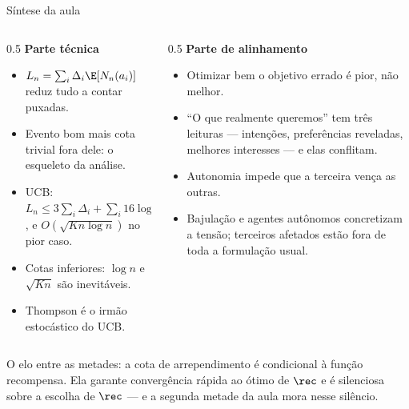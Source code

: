 \documentclass[aspectratio=169, 11pt]{beamer}
\begin{document}
\begin{frame}{Síntese da aula}
  \begin{columns}[T]
    \begin{column}{0.5\textwidth}
      \textbf{Parte técnica}
      {\footnotesize
      \begin{itemize}\setlength{\itemsep}{0.15ex}
        \item $L_n=\sum_i\Delta_i\E[N_n(a_i)]$ reduz tudo a contar puxadas.
        \item Evento bom mais cota trivial fora dele: o esqueleto da análise.
        \item UCB: $L_n \le 3\sum_i\Delta_i + \sum_i 16\log n/\Delta_i$, e
              $O(\sqrt{Kn\log n})$ no pior caso.
        \item Cotas inferiores: $\log n$ e $\sqrt{Kn}$ são inevitáveis.
        \item Thompson é o irmão estocástico do UCB.
      \end{itemize}}
    \end{column}
    \begin{column}{0.5\textwidth}
      \textbf{Parte de alinhamento}
      {\footnotesize
      \begin{itemize}\setlength{\itemsep}{0.15ex}
        \item Otimizar bem o objetivo errado é pior, não melhor.
        \item ``O que realmente queremos'' tem três leituras --- intenções,
              preferências reveladas, melhores interesses --- e elas conflitam.
        \item Autonomia impede que a terceira vença as outras.
        \item Bajulação e agentes autônomos concretizam a tensão; terceiros
              afetados estão fora de toda a formulação usual.
      \end{itemize}}
    \end{column}
  \end{columns}

  \begin{ideiabox}
    O elo entre as metades: \alert{a cota de arrependimento é condicional à
    função recompensa}. Ela garante convergência rápida ao ótimo de $\rec$ e é
    silenciosa sobre a escolha de $\rec$ --- e a segunda metade da aula mora
    nesse silêncio.
  \end{ideiabox}
\end{frame}
\end{document}
